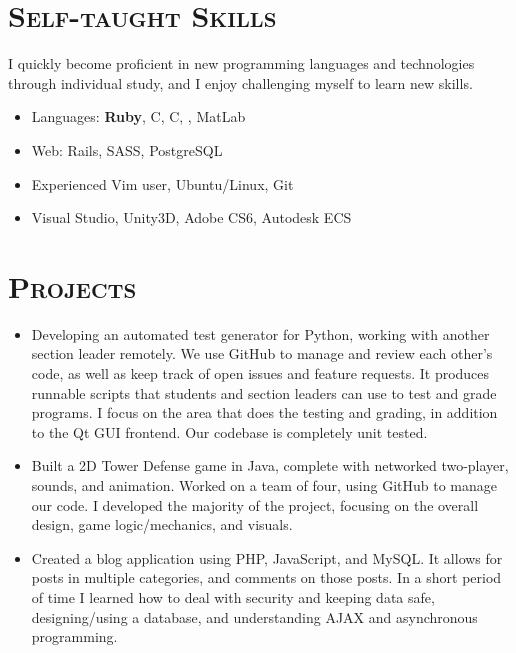 \documentclass[11pt,letterpaper]{article}
\newcommand{\CPP}
{C\nolinebreak[4]\hspace{-.05em}\raisebox{.22ex}{\footnotesize\bf ++}}
\newcommand{\CS}
{C\nolinebreak[4]\hspace{-.05em}\raisebox{.22ex}{\footnotesize\bf \#}}
\begin{document}
\begin{minipage}{\textwidth}
\section{\scshape Self-taught Skills}
\vspace{-2mm}
I quickly become proficient in new programming languages and technologies through individual study,
and I enjoy challenging myself to learn new skills.
\vspace{3mm}
\begin{itemize}
 \item Languages: {\bfseries Ruby}, \CPP, \CS, \textls{\LaTeX}, MatLab
 \item Web: Rails, SASS, PostgreSQL
 \item Experienced Vim user, Ubuntu/Linux, Git
 \item Visual Studio, Unity3D, Adobe CS6, Autodesk ECS
\end{itemize}

\vspace{-3mm}
\section{\scshape Projects}
\vspace{-2mm}

\begin{itemize}
 \item Developing an automated test generator for Python, working with another section leader remotely. We use GitHub to
 manage and review each other's code, as well as keep track of open issues and feature requests. It produces runnable
 scripts that students and section leaders can use to test and grade programs. I focus on the
 area that does the testing and grading, in addition to the Qt GUI frontend. Our codebase is
 completely unit tested.
 \item Built a 2D Tower Defense game in Java, complete with networked two-player, sounds, and animation. Worked on 
 a team of four, using GitHub to manage our code. I developed the majority of the project, focusing on the
 overall design, game logic/mechanics, and visuals.
 \item Created a blog application using PHP, JavaScript, and MySQL. It allows for posts in
 multiple categories, and comments on those posts. In a short period of time I learned how to deal with
 security and keeping data safe, designing/using a database, and understanding AJAX and asynchronous programming.
\end{itemize}



\end{minipage}
\end{document}
